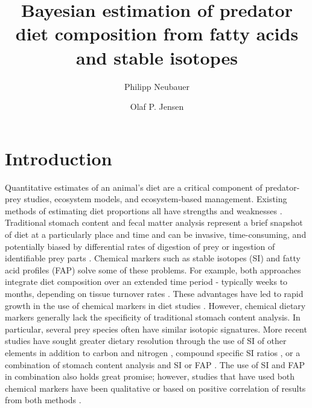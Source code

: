 \documentclass[fleqn,10pt]{wlpeerj}
\title{Bayesian estimation of predator diet composition from fatty
  acids and stable isotopes}
\author[1]{Philipp Neubauer}
\author[2]{Olaf P. Jensen}
\affil[1]{Dragonfly Science, PO Box 27535, Wellington 6141, New Zealand}
\affil[2]{Institute of Marine and Coastal Sciences\\Rutgers University, New Brunswick, NJ 08901, USA}
\begin{document}
\flushbottom
\maketitle
\thispagestyle{empty}

\section*{Introduction}

Quantitative estimates of an animal’s diet are a critical component of
predator-prey studies, ecosystem models, and ecosystem-based
management. Existing methods of estimating diet proportions all have
strengths and weaknesses \citep{bowen_methods_2012}. Traditional
stomach content and fecal matter analysis represent a brief snapshot
of diet at a particularly place and time and can be invasive,
time-consuming, and potentially biased by differential rates of
digestion of prey or ingestion of identifiable prey parts
\citep{bowen_methods_2012}. Chemical markers such as stable isotopes
(SI) and fatty acid profiles (FAP) solve some of these problems.  For
example, both approaches integrate diet composition over an extended
time period -  typically weeks to months, depending on tissue turnover
rates  \citep{tucker_convergence_2008}. These advantages have led to rapid
growth in the use of chemical markers in diet studies
 \citep{elsdon_unraveling_2010,williams_using_2010,kelly_fatty_2011,
bowen_methods_2012}. However, chemical dietary markers generally lack
the specificity of traditional stomach content analysis. In
particular, several prey species often have similar isotopic signatures. More
recent studies have sought greater dietary resolution through the use
of SI of other elements in addition to carbon and
nitrogen \citep[e.g.,][]{belicka_stable_2012}, compound specific SI ratios
\citep[e.g.,][]{budge_tracing_2008,jack_individual_2011}, or a combination of stomach
content analysis and SI or FAP \citep[e.g.,][]{pethybridge_seasonal_2012}. The
use of SI and FAP in combination also holds great promise; however, studies that have used both chemical markers have been
qualitative \citep[e.g.,][]{guest_trophic_2009} or based on positive correlation
of results from both methods \citep{tucker_convergence_2008}.
\end{document}
